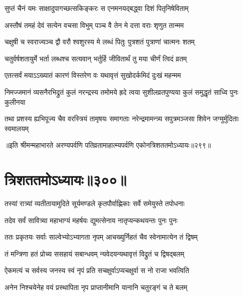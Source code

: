 \twolineshloka
{सुप्तं चैनं यमः साक्षादुपागच्छत्सकिङ्करः}
{स एनमनयद्बद्ध्वा दिशं पितृनिषेविताम्}


\twolineshloka
{अस्तौषं तमहं देवं सत्येन वचसा विभुम्}
{पञ्च वै तेन मे दत्ता वराः शृणुत तान्मम}


\twolineshloka
{चक्षुषी च स्वराज्यञ्च द्वौ वरौ श्वशुरस्य मे}
{लब्धं पितुः पुत्रशतं पुत्राणां चात्मनः शतम्}


\twolineshloka
{चतुर्वर्षशतायुर्मे भर्ता लब्धश्च सत्यवान्}
{भर्तुर्हि जीवितार्थं तु मया चीर्णं त्विदं व्रतम्}



\twolineshloka
{एतत्सर्वं मयाऽऽख्यातं कारणं विस्तरेण वः}
{यथावृत्तं सुखोदर्कमिदं दुःखं महन्मम}




\fourlineindentedshloka
{निमज्जमानं व्यसनैरभिद्रुतं}
{कुलं नरन्द्रस्य तमोमये ह्रदे}
{त्वया सुशीलव्रतपुण्यया कुलं}
{समुद्धृतं साध्वि पुनः कुलीनया}




\fourlineindentedshloka
{तथा प्रशस्य ह्यभिपूज्य चैव}
{वरस्त्रियं तामृषयः समागताः}
{नरेन्द्रमामन्त्र्य सपुत्रमञ्जसा}
{शिवेन जग्मुर्मुदिताः स्वमालयम्}


॥इति श्रीमन्महाभारते अरण्यपर्वणि पतिव्रतामाहात्म्यपर्वणि एकोनत्रिशततमोऽध्यायः॥२९९॥


\chapter{त्रिशततमोऽध्यायः॥३००॥}


\twolineshloka
{तस्यां रात्र्यां व्यतीतायामुदिते सूर्यमण्डले}
{कृतपौर्वाह्णिकाः सर्वे समेयुस्ते तपोधनाः}


\twolineshloka
{तदेव सर्वं सावित्र्या महाभाग्यं महर्षयः}
{द्युमत्सेनाय नातृप्यन्कथयन्तः पुनः पुनः}


\twolineshloka
{ततः प्रकृतयः सर्वाः साल्वेभ्योऽभ्यागता नृपम्}
{आचख्युर्निहतं चैव स्वेनामात्येन तं द्विषम्}


\twolineshloka
{तं मन्त्रिणा हतं प्रोच्य ससहायं सबान्धवम्}
{न्यवेदयन्यथावृत्तं विद्रुतं च द्विषद्बलम्}


\twolineshloka
{ऐकमत्यं च सर्वस्य जनस्य स्वं नृपं प्रति}
{सचक्षुर्वाऽप्यचक्षुर्वा स नो राजा भवत्विति}


\twolineshloka
{अनेन निश्चयेनेह वयं प्रस्थापिता नृप}
{प्राप्तानीमानि यानानि चतुरङ्गं च ते बलम्}


